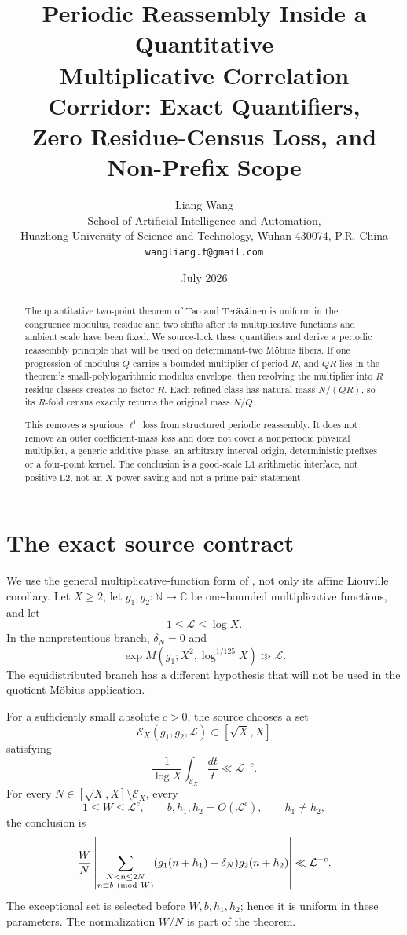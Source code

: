 \documentclass[11pt]{article}
\title{\textbf{Periodic Reassembly Inside a Quantitative}\\
\textbf{Multiplicative Correlation Corridor: Exact Quantifiers,}\\
\textbf{Zero Residue-Census Loss, and Non-Prefix Scope}}
\author{Liang Wang\\
School of Artificial Intelligence and Automation,\\
Huazhong University of Science and Technology, Wuhan 430074, P.R. China\\
\texttt{wangliang.f@gmail.com}}
\date{July 2026}
\theoremstyle{definition}
\theoremstyle{remark}
\newcommand{\Lone}{\mathrm{L1}}
\newcommand{\Ltwo}{\mathrm{L2}}
\begin{document}
\maketitle

\begin{abstract}
The quantitative two-point theorem of Tao and Ter\"av\"ainen is
uniform in the congruence modulus, residue and two shifts after its
multiplicative functions and ambient scale have been fixed.  We
source-lock these quantifiers and derive a periodic reassembly
principle that will be used on determinant-two M\"obius fibers.  If
one progression of modulus \(Q\) carries a bounded multiplier of
period \(R\), and \(QR\) lies in the theorem's small-polylogarithmic
modulus envelope, then resolving the multiplier into \(R\) residue
classes creates no factor \(R\).  Each refined class has natural mass
\(N/(QR)\), so its \(R\)-fold census exactly returns the original
mass \(N/Q\).

This removes a spurious \(\ell^1\) loss from structured periodic
reassembly.  It does not remove an outer coefficient-mass loss and
does not cover a nonperiodic physical multiplier, a generic additive
phase, an arbitrary interval origin, deterministic prefixes or a
four-point kernel.  The conclusion is a good-scale \(\Lone\)
arithmetic interface, not positive \(\Ltwo\), not an \(X\)-power
saving and not a prime-pair statement.
\end{abstract}

\section{The exact source contract}

We use the general multiplicative-function form of
\citet[Theorem~3.1]{TaoTeravainen2026}, not only its affine Liouville
corollary.  Let \(X\ge2\), let \(g_1,g_2:\mathbb N\to\mathbb C\) be
one-bounded multiplicative functions, and let
\[
 1\le\mathcal L\le\log X.
\]
In the nonpretentious branch, \(\delta_N=0\) and
\begin{equation}
 \exp M(g_1;X^2,\log^{1/125}X)\gg\mathcal L.
\label{eq:nonpret}
\end{equation}
The equidistributed branch has a different hypothesis that will not
be used in the quotient-M\"obius application.

For a sufficiently small absolute \(c>0\), the source chooses a set
\[
 \mathcal E_X(g_1,g_2,\mathcal L)\subset[\sqrt X,X]
\]
satisfying
\begin{equation}
 \frac1{\log X}\int_{\mathcal E_X}\frac{dt}{t}
 \ll \mathcal L^{-c}.
\label{eq:exception}
\end{equation}
For every \(N\in[\sqrt X,X]\setminus\mathcal E_X\), every
\[
 1\le W\le\mathcal L^c,
 \qquad b,h_1,h_2=O(\mathcal L^c),
 \qquad h_1\ne h_2,
\]
the conclusion is
\begin{equation}
 \frac WN\left|
 \sum_{\substack{N<n\le2N\\n\equiv b\ ({\rm mod}\ W)}}
 (g_1(n+h_1)-\delta_N)g_2(n+h_2)
 \right|
 \ll \mathcal L^{-c}.
\label{eq:source}
\end{equation}
The exceptional set is selected before \(W,b,h_1,h_2\); hence it is
uniform in these parameters.  The normalization \(W/N\) is part of
the theorem.
\end{document}
